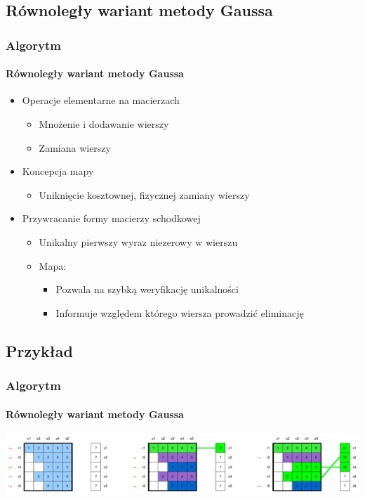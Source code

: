 \documentclass{beamer}
\begin{document}
\subsection{Równoległy wariant metody Gaussa}
\begin{frame}
\frametitle{Algorytm}
\framesubtitle{Równoległy wariant metody Gaussa}

\begin{itemize}[<+->]
\item Operacje elementarne na macierzach
\begin{itemize}
\item Mnożenie i dodawanie wierszy
\item Zamiana wierszy
\end{itemize}
\item Koncepcja mapy
\begin{itemize}
\item Uniknięcie kosztownej, fizycznej zamiany wierszy
\end{itemize}
\item Przywracanie formy macierzy schodkowej
	\begin{itemize}
	\item Unikalny pierwszy wyraz niezerowy w wierszu
	\item Mapa:
		\begin{itemize}
		\item Pozwala na szybką weryfikację unikalności
		\item Informuje względem którego wiersza prowadzić eliminację
		\end{itemize}
	\end{itemize}
\end{itemize}
\end{frame}

\subsection{Przykład}

\begin{frame}
\frametitle{Algorytm}
\framesubtitle{Równoległy wariant metody Gaussa}
\hfill\includegraphics[scale=0.3]{faza1_initialSelections.png}\hspace*{\fill}
\end{frame}
\end{document}
